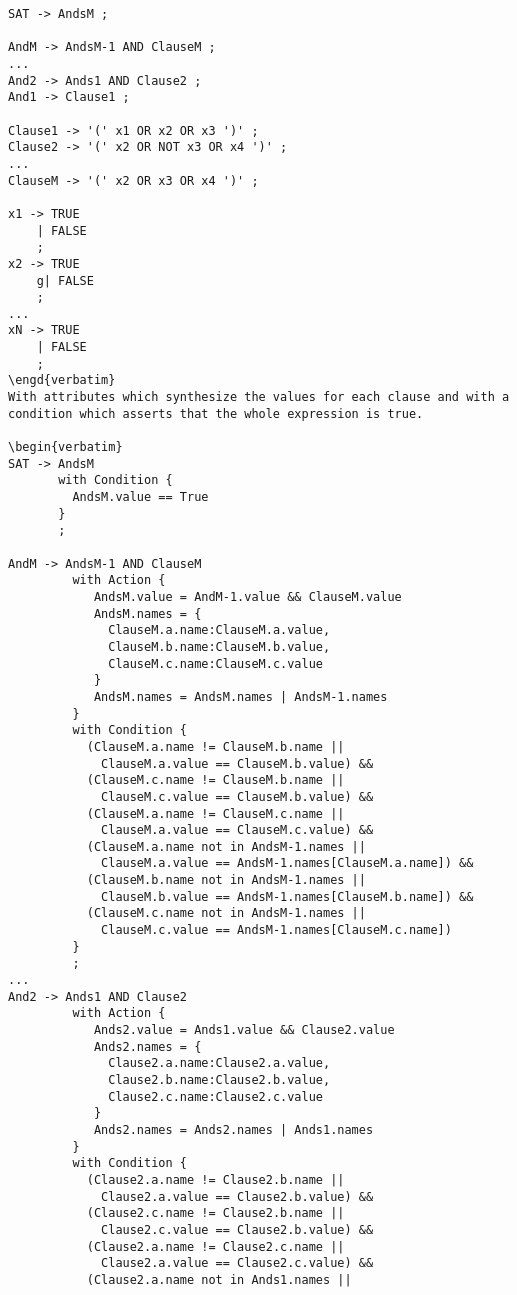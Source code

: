 \begin{verbatim}
SAT -> AndsM ;

AndM -> AndsM-1 AND ClauseM ;
...
And2 -> Ands1 AND Clause2 ;
And1 -> Clause1 ;

Clause1 -> '(' x1 OR x2 OR x3 ')' ;
Clause2 -> '(' x2 OR NOT x3 OR x4 ')' ;
...
ClauseM -> '(' x2 OR x3 OR x4 ')' ;

x1 -> TRUE
    | FALSE
    ;
x2 -> TRUE
    g| FALSE
    ;
...
xN -> TRUE
    | FALSE
    ;
\engd{verbatim}
With attributes which synthesize the values for each clause and with a
condition which asserts that the whole expression is true.

\begin{verbatim}
SAT -> AndsM
       with Condition {
         AndsM.value == True
       }
       ;

AndM -> AndsM-1 AND ClauseM
         with Action {
            AndsM.value = AndM-1.value && ClauseM.value
            AndsM.names = {
              ClauseM.a.name:ClauseM.a.value,
              ClauseM.b.name:ClauseM.b.value,
              ClauseM.c.name:ClauseM.c.value
            }
            AndsM.names = AndsM.names | AndsM-1.names
         }
         with Condition {
           (ClauseM.a.name != ClauseM.b.name ||
             ClauseM.a.value == ClauseM.b.value) &&
           (ClauseM.c.name != ClauseM.b.name ||
             ClauseM.c.value == ClauseM.b.value) &&
           (ClauseM.a.name != ClauseM.c.name ||
             ClauseM.a.value == ClauseM.c.value) &&
           (ClauseM.a.name not in AndsM-1.names ||
             ClauseM.a.value == AndsM-1.names[ClauseM.a.name]) &&
           (ClauseM.b.name not in AndsM-1.names ||
             ClauseM.b.value == AndsM-1.names[ClauseM.b.name]) &&
           (ClauseM.c.name not in AndsM-1.names ||
             ClauseM.c.value == AndsM-1.names[ClauseM.c.name])
         }
         ;
...
And2 -> Ands1 AND Clause2
         with Action {
            Ands2.value = Ands1.value && Clause2.value
            Ands2.names = {
              Clause2.a.name:Clause2.a.value,
              Clause2.b.name:Clause2.b.value,
              Clause2.c.name:Clause2.c.value
            }
            Ands2.names = Ands2.names | Ands1.names
         }
         with Condition {
           (Clause2.a.name != Clause2.b.name ||
             Clause2.a.value == Clause2.b.value) &&
           (Clause2.c.name != Clause2.b.name ||
             Clause2.c.value == Clause2.b.value) &&
           (Clause2.a.name != Clause2.c.name ||
             Clause2.a.value == Clause2.c.value) &&
           (Clause2.a.name not in Ands1.names ||

\end{verbatim}
